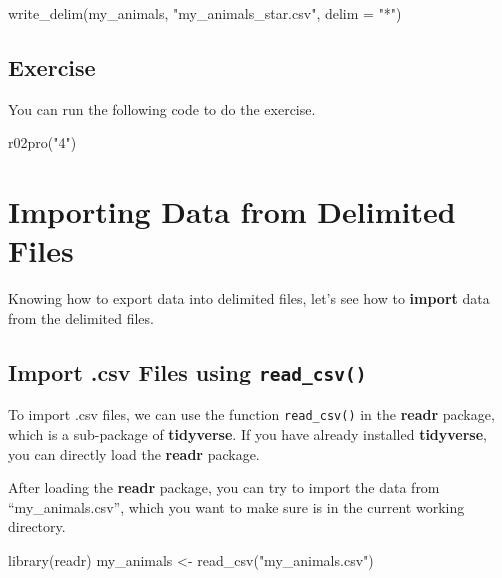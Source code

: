 \documentclass[
]{book}
\newenvironment{Shaded}{\begin{snugshade}}{\end{snugshade}}
\newcommand{\AttributeTok}[1]{\textcolor[rgb]{0.77,0.63,0.00}{#1}}
\newcommand{\FunctionTok}[1]{\textcolor[rgb]{0.00,0.00,0.00}{#1}}
\newcommand{\NormalTok}[1]{#1}
\newcommand{\OtherTok}[1]{\textcolor[rgb]{0.56,0.35,0.01}{#1}}
\newcommand{\StringTok}[1]{\textcolor[rgb]{0.31,0.60,0.02}{#1}}
\begin{document}
\begin{Shaded}
\begin{Highlighting}[]
\FunctionTok{write\_delim}\NormalTok{(my\_animals, }\StringTok{"my\_animals\_star.csv"}\NormalTok{, }\AttributeTok{delim =} \StringTok{"*"}\NormalTok{)}
\end{Highlighting}
\end{Shaded}

\hypertarget{exercise-8}{%
\subsection{Exercise}\label{exercise-8}}

You can run the following code to do the exercise.

\begin{Shaded}
\begin{Highlighting}[]
\FunctionTok{r02pro}\NormalTok{(}\StringTok{"4"}\NormalTok{)}
\end{Highlighting}
\end{Shaded}

\hypertarget{import-data}{%
\section{Importing Data from Delimited Files}\label{import-data}}

Knowing how to export data into delimited files, let's see how to \textbf{import} data from the delimited files.

\hypertarget{import-.csv-files-using-read_csv}{%
\subsection{\texorpdfstring{Import .csv Files using \texttt{read\_csv()}}{Import .csv Files using read\_csv()}}\label{import-.csv-files-using-read_csv}}

To import .csv files, we can use the function \texttt{read\_csv()} in the \textbf{readr} package, which is a sub-package of \textbf{tidyverse}. If you have already installed \textbf{tidyverse}, you can directly load the \textbf{readr} package.

After loading the \textbf{readr} package, you can try to import the data from ``my\_animals.csv'', which you want to make sure is in the current working directory.

\begin{Shaded}
\begin{Highlighting}[]
\FunctionTok{library}\NormalTok{(readr)}
\NormalTok{my\_animals }\OtherTok{\textless{}{-}} \FunctionTok{read\_csv}\NormalTok{(}\StringTok{"my\_animals.csv"}\NormalTok{)}
\end{Highlighting}
\end{Shaded}
\end{document}
